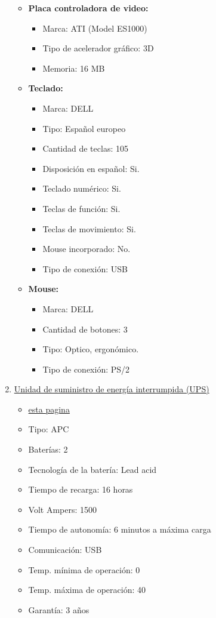 \begin{enumerate}
\begin{itemize}
    \item \textbf{Placa controladora de video:}
    \begin{itemize}
      \item Marca: ATI (Model ES1000)
      \item Tipo de acelerador gráfico: 3D
      \item Memoria: 16 MB
    \end{itemize}
    
    \item \textbf{Teclado:}
    \begin{itemize}
      \item Marca: DELL
      \item Tipo: Español europeo
      \item Cantidad de teclas: 105
      \item Disposición en español: Si.
      \item Teclado numérico: Si.
      \item Teclas de función: Si.
      \item Teclas de movimiento: Si.
      \item Mouse incorporado: No.
      \item Tipo de conexión: USB
    \end{itemize}
    
    \item \textbf{Mouse:}
    \begin{itemize}
      \item Marca: DELL
      \item Cantidad de botones: 3
      \item Tipo: Optico, ergonómico.
      \item Tipo de conexión: PS/2
    \end{itemize}
  \end{itemize}
  
  \item \underline{Unidad de suministro de energía interrumpida (UPS)}
  \begin{itemize}
    \item {} \href{http://accessories.us.dell.com/sna/productdetail.aspx?c=us&l=en&s=bsd&cs=04&sku=A0973336}{esta pagina}
    \item Tipo: APC
    \item Baterías: 2
    \item Tecnología de la batería: Lead acid
    \item Tiempo de recarga: 16 horas
    \item Volt Ampers: 1500
    \item Tiempo de autonomía: 6 minutos a máxima carga
    \item Comunicación: USB
    \item Temp. mínima de operación: 0 \textcelsius
    \item Temp. máxima de operación: 40 \textcelsius
    \item Garantía: 3 años 
  \end{itemize}
      
\end{enumerate}
